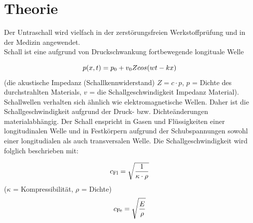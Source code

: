 \section{Theorie}
\label{sec:Theorie}
Der Untraschall wird vielfach in der zerstörungsfreien Werkstoffprüfung und in der Medizin angewendet.\\
\noindent Schall ist eine aufgrund von Druckschwankung fortbewegende longituale Welle

\begin{equation}
    p(x,t) = p_0 +v_0 Z cos(wt-kx)\\
\end{equation}
\noindent (die akustische Impedanz (Schallkennwiderstand) $Z=c\cdot p$, $p$ = Dichte des durchstrahlten Materials, $v$ =
die Schallgeschwindigkeit Impedanz Material).\\
\noindent
Schallwellen verhalten sich ähnlich wie elektromagnetische Wellen. Daher ist die Schallgeschwindigkeit aufgrund der Druck- bzw. Dichteänderungen materialabhängig.
Der Schall enspricht in Gasen und  Flüssigkeiten einer longitudinalen Welle und in Festkörpern aufgrund der Schubspannungen sowohl einer longitudialen als auch transversalen Welle.
Die Schallgeschwindigkeit wird folglich beschrieben mit:

\begin{equation}
    c_{\text{Fl}} = \sqrt{\frac{1}{\kappa \cdot \rho}}\\
\end{equation}
\noindent ($\kappa$ = Kompressibilität, $\rho$ = Dichte)  
\begin{equation}
    c_{\text{Fe}} = \sqrt{\frac{E}{ \rho}}\\
\end{equation} 


